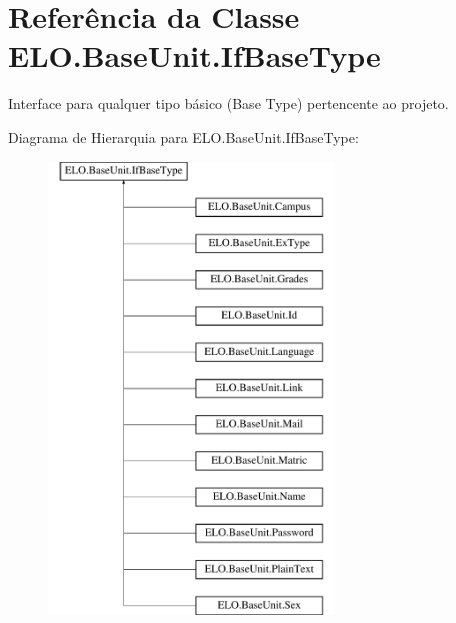 \hypertarget{classELO_1_1BaseUnit_1_1IfBaseType}{\section{Referência da Classe E\-L\-O.\-Base\-Unit.\-If\-Base\-Type}
\label{d7/d79/classELO_1_1BaseUnit_1_1IfBaseType}
}


Interface para qualquer tipo básico (Base Type) pertencente ao projeto.  


Diagrama de Hierarquia para E\-L\-O.\-Base\-Unit.\-If\-Base\-Type\-:\begin{figure}[H]
\begin{center}
\leavevmode
\includegraphics[height=12.000000cm]{d7/d79/classELO_1_1BaseUnit_1_1IfBaseType}
\end{center}
\end{figure}
